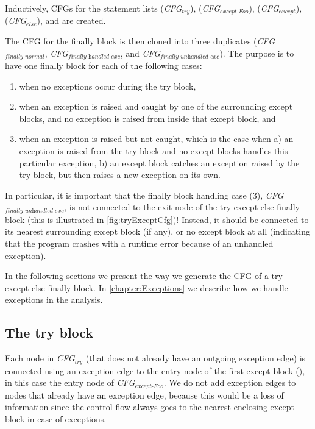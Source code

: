\begin{sloppypar}
  Inductively, CFGs for the statement lists  (\textit{CFG$_{\textit{try}}$}), 
   (\textit{CFG$_{\textit{except-Foo}}$}),  (\textit{CFG$_{\textit{except}}$}), 
   (\textit{CFG$_{\textit{else}}$}), and  are created. 
\end{sloppypar}

The CFG for the finally block is then cloned into three duplicates (\textit{CFG$_{\textit{finally-normal}}$}, 
\textit{CFG$_{\textit{finally-handled-exc}}$}, and \textit{CFG$_{\textit{finally-unhandled-exc}}$}). The purpose is to have one finally block for each of the following cases: 

\begin{enumerate}
  \item when no exceptions occur during the try block,
  \item when an exception is raised and caught by one of the surrounding except blocks, and no exception is raised from inside that except block, and
  \item when an exception is raised but not caught, which is the case when 
    a) an exception is raised from the try block and no except blocks handles this particular exception, 
    b) an except block catches an exception raised by the try block, but then raises a new exception on its own.
\end{enumerate}

In particular, it is important that the finally block handling case (3), \textit{CFG$_{\textit{finally-unhandled-exc}}$}, 
is not connected to the exit node of the try-except-else-finally block (this is illustrated in \autoref{fig:tryExceptCfg})! Instead, it should be connected to its nearest surrounding except block (if any), or no except block at all (indicating that the program crashes with a runtime error because of an unhandled exception).

In the following sections we present the way we generate the CFG of a try-except-else-finally block. In \autoref{chapter:Exceptions} we describe how we handle exceptions in the analysis.


\subsection{The try block}
Each node in \textit{CFG$_{\textit{try}}$} (that does not already have an outgoing exception edge) is connected using an exception edge to the entry node of the first except block (\inlinecode{*}), in this case the entry node of \textit{CFG$_{\textit{except-Foo}}$}. We do not add exception edges to nodes that already have an exception edge, because this would be a loss of information since the control flow always goes to the nearest enclosing except block in case of exceptions.

